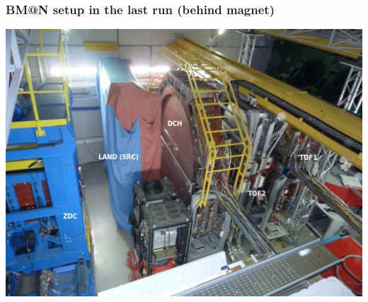 \documentclass[dvipsnames] {beamer}
\begin{document}
\begin{frame}
  \bf
  \frametitle{\bf \centering BM@N setup in the last run (behind magnet)}
  \begin{minipage}{1.\linewidth}
    \includegraphics[width=1.\linewidth]{detectors_behind_magnet.jpg}
  \end{minipage}
\end{frame}
\end{document}
